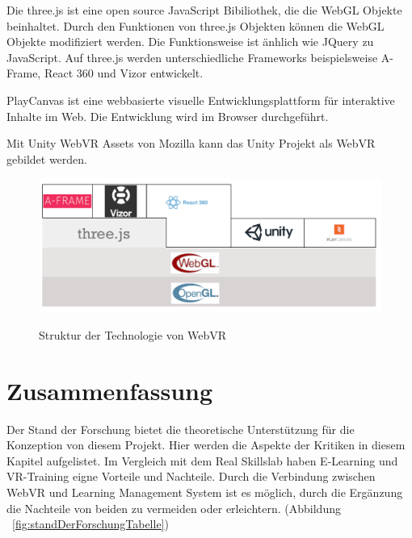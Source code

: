  Die three.js ist eine open source JavaScript Bibiliothek, die die WebGL Objekte beinhaltet. Durch den Funktionen von three.js Objekten können die WebGL Objekte modifiziert werden. Die Funktionsweise ist änhlich wie JQuery zu JavaScript. Auf three.js werden unterschiedliche Frameworks beispielsweise A-Frame, React 360 und Vizor entwickelt.
 
 PlayCanvas ist eine webbasierte visuelle Entwicklungsplattform für interaktive Inhalte im Web. Die Entwicklung wird im Browser durchgeführt.
 
 Mit Unity WebVR Assets von Mozilla kann das Unity Projekt als WebVR gebildet werden.

\begin{figure}[ht]
\vspace*{1em}
\centering
\caption{Struktur der Technologie von WebVR}
\includegraphics[width=\textwidth]{images/webVRStruckture.png}
\label{fig:webVRStruckture} 
\end{figure}

\section{Zusammenfassung}
Der Stand der Forschung bietet die theoretische Unterstützung für die Konzeption von diesem Projekt. Hier werden die Aspekte der Kritiken in diesem Kapitel aufgelistet. Im Vergleich mit dem Real Skillslab haben E-Learning und VR-Training eigne Vorteile und Nachteile. Durch die Verbindung zwischen WebVR und Learning Management System ist es möglich, durch die Ergänzung die Nachteile von beiden zu vermeiden oder erleichtern. (Abbildung ~\ref{fig:standDerForschungTabelle})

